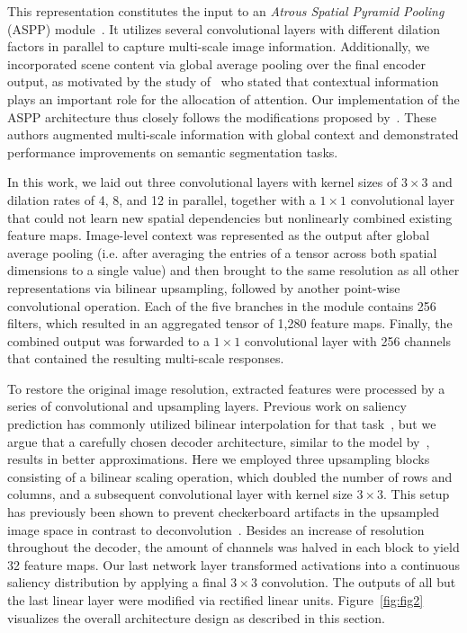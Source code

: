 \documentclass[final,1p,times,number]{elsarticle}
\begin{document}
This representation constitutes the input to an \textit{Atrous Spatial Pyramid Pooling} (ASPP) module~\cite{chen2018deeplab}. It utilizes several convolutional layers with different dilation factors in parallel to capture multi-scale image information. Additionally, we incorporated scene content via global average pooling over the final encoder output, as motivated by the study of~\citet{torralba2006contextual} who stated that contextual information plays an important role for the allocation of attention. Our implementation of the ASPP architecture thus closely follows the modifications proposed by~\citet{chen2017rethinking}. These authors augmented multi-scale information with global context and demonstrated performance improvements on semantic segmentation tasks.

\newpage

In this work, we laid out three convolutional layers with kernel sizes of $3\times3$ and dilation rates of 4, 8, and 12 in parallel, together with a $1\times1$ convolutional layer that could not learn new spatial dependencies but nonlinearly combined existing feature maps. Image-level context was represented as the output after global average pooling (i.e. after averaging the entries of a tensor across both spatial dimensions to a single value) and then brought to the same resolution as all other representations via bilinear upsampling, followed by another point-wise convolutional operation. Each of the five branches in the module contains 256 filters, which resulted in an aggregated tensor of 1,280 feature maps. Finally, the combined output was forwarded to a $1\times1$ convolutional layer with 256 channels that contained the resulting multi-scale responses.

To restore the original image resolution, extracted features were processed by a series of convolutional and upsampling layers. Previous work on saliency prediction has commonly utilized bilinear interpolation for that task~\cite{Cornia2018PredictingHE,liu2018deep}, but we argue that a carefully chosen decoder architecture, similar to the model by~\citet{pan2017salgan}, results in better approximations. Here we employed three upsampling blocks consisting of a bilinear scaling operation, which doubled the number of rows and columns, and a subsequent convolutional layer with kernel size $3\times3$. This setup has previously been shown to prevent checkerboard artifacts in the upsampled image space in contrast to deconvolution~\cite{odena2016deconvolution}. Besides an increase of resolution throughout the decoder, the amount of channels was halved in each block to yield 32 feature maps. Our last network layer transformed activations into a continuous saliency distribution by applying a final $3\times3$ convolution. The outputs of all but the last linear layer were modified via rectified linear units. Figure~\ref{fig:fig2} visualizes the overall architecture design as described in this section.
\end{document}
